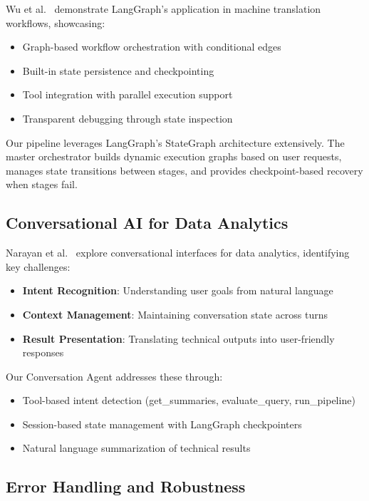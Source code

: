 \documentclass[11pt,a4paper]{article}
\begin{document}
Wu et al.~\cite{langgraph_mt} demonstrate LangGraph's application in machine translation workflows, showcasing:

\begin{itemize}
    \item Graph-based workflow orchestration with conditional edges
    \item Built-in state persistence and checkpointing
    \item Tool integration with parallel execution support
    \item Transparent debugging through state inspection
\end{itemize}

Our pipeline leverages LangGraph's StateGraph architecture extensively. The master orchestrator builds dynamic execution graphs based on user requests, manages state transitions between stages, and provides checkpoint-based recovery when stages fail.

\subsection{Conversational AI for Data Analytics}

Narayan et al.~\cite{conversational_analytics} explore conversational interfaces for data analytics, identifying key challenges:

\begin{itemize}
    \item \textbf{Intent Recognition}: Understanding user goals from natural language
    \item \textbf{Context Management}: Maintaining conversation state across turns
    \item \textbf{Result Presentation}: Translating technical outputs into user-friendly responses
\end{itemize}

Our Conversation Agent addresses these through:

\begin{itemize}
    \item Tool-based intent detection (get\_summaries, evaluate\_query, run\_pipeline)
    \item Session-based state management with LangGraph checkpointers
    \item Natural language summarization of technical results
\end{itemize}

\subsection{Error Handling and Robustness}
\end{document}
